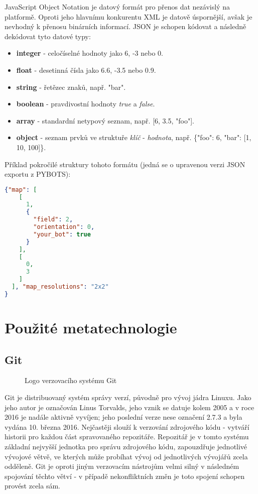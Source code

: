 \documentclass[10pt,titlepage,a4paper]{extarticle}
\begin{document}
JavaScript Object Notation je datový formát pro přenos dat nezávislý na platformě. Oproti jeho hlavnímu konkurentu XML je datově úspornější, avšak je nevhodný k přenosu binárních informací. JSON je schopen kódovat a následně dekódovat tyto datové typy:

\begin{itemize}
    \item
    \textbf{integer} - celočíselné hodnoty jako 6, -3 nebo 0.

    \item
    \textbf{float} - desetinná čísla jako 6.6, -3.5 nebo 0.9.

    \item
    \textbf{string} - řetězec znaků, např. "bar".

    \item
    \textbf{boolean} - pravdivostní hodnoty \textit{true} a \textit{false}.

    \item
    \textbf{array} - standardní netypový seznam, např. [6, 3.5, "foo"].

    \item
    \textbf{object} - seznam prvků ve struktuře \textit{klíč} - \textit{hodnota}, např. \{"foo": 6, "bar": [1, 10, 100]\}.
\end{itemize}

Příklad pokročilé struktury tohoto formátu (jedná se o upravenou verzi JSON exportu z PYBOTS):

\begin{lstlisting}[language=json]
 {"map": [
    [
      1,
      {
        "field": 2,
        "orientation": 0,
        "your_bot": true
      }
    ],
    [
      0,
      3
    ]
  ], "map_resolutions": "2x2"
}
\end{lstlisting}

\section{Použité metatechnologie}

\subsection{Git}

\begin{figure}[H]
 \centering
 
 \caption{Logo verzovacího systému Git}
\end{figure}

Git je distribuovaný systém správy verzí, původně pro vývoj jádra Linuxu. Jako jeho autor je označován Linus Torvalds, jeho vznik se datuje kolem 2005 a v roce 2016 je nadále aktivně vyvíjen; jeho poslední verze nese označení 2.7.3 a byla vydána 10. března 2016. Nejčastěji slouží k verzování zdrojového kódu - vytváří historii pro každou část spravovaného repozitáře. Repozitář je v tomto systému základní nejvyšší jednotka pro správu zdrojového kódu, zapouzdřuje jednotlivé vývojové větvě, ve kterých může probíhat vývoj od jednotlivých vývojářů zcela odděleně. Git je oproti jiným verzovacím nástrojům velmi silný v následném spojování těchto větví - v případě nekonfliktních změn je toto spojení schopen provést zcela sám.
\end{document}
